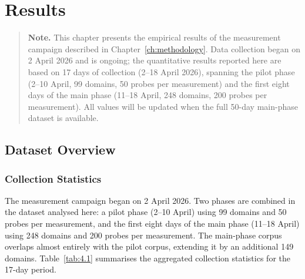 
\chapter{Results}
\label{ch:results}

\begin{quote}
\textbf{Note.} This chapter presents the empirical results of the measurement campaign described in Chapter~\ref{ch:methodology}. Data collection began on 2 April 2026 and is ongoing; the quantitative results reported here are based on 17 days of collection (2--18 April 2026), spanning the pilot phase (2--10 April, 99 domains, 50 probes per measurement) and the first eight days of the main phase (11--18 April, 248 domains, 200 probes per measurement). All values will be updated when the full 50-day main-phase dataset is available.
\end{quote}
\bigskip
\section{Dataset Overview}
\label{sec:4.1}

\subsection{Collection Statistics}
\label{subsec:4.1.1}

The measurement campaign began on 2 April 2026. Two phases are combined in the dataset analysed here: a pilot phase (2--10 April) using 99 domains and 50 probes per measurement, and the first eight days of the main phase (11--18 April) using 248 domains and 200 probes per measurement. The main-phase corpus overlaps almost entirely with the pilot corpus, extending it by an additional 149 domains. Table~\ref{tab:4.1} summarises the aggregated collection statistics for the 17-day period.

